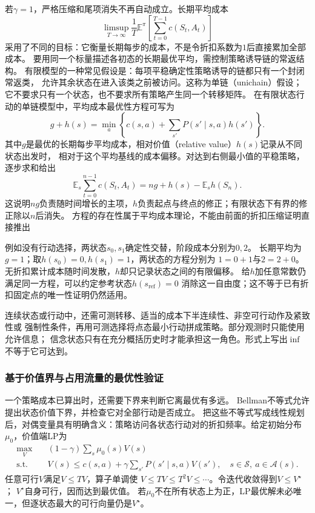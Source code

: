 若$\gamma=1$，严格压缩和尾项消失不再自动成立。长期平均成本
\[
  \limsup_{T\to\infty}\frac1T
    \mathbb E^\pi\left[\sum_{t=0}^{T-1}c(S_t,A_t)\right]
\]
采用了不同的目标：它衡量长期每步的成本，不是令折扣系数为$1$后直接累加全部成本。
要用同一个标量描述各初态的长期最优平均，需控制策略诱导链的常返结构。
有限模型的一种常见假设是：每项平稳确定性策略诱导的链都只有一个封闭常返类，
允许其余状态在进入该类之前被访问。这称为单链（unichain）假设；
它不要求只有一个状态，也不要求所有策略产生同一个转移矩阵。
在有限状态行动的单链模型中，平均成本最优性方程可写为
\[
  g+h(s)=\min_a\left\{c(s,a)+\sum_{s'}P(s'\mid s,a)h(s')\right\}.
\]
其中$g$是最优的长期每步平均成本，相对价值（relative value）$h(s)$记录从不同状态出发时，
相对于这个平均基线的成本偏移。对达到右侧最小值的平稳策略，逐步求和给出
\[
 \mathbb E_s\sum_{t=0}^{n-1}c(S_t,A_t)
 =ng+h(s)-\mathbb E_s h(S_n).
\]
这说明$ng$负责随时间增长的主项，$h$负责起点与终点的修正；有限状态下有界的修正除以$n$后消失。
方程的存在性属于平均成本理论，不能由前面的折扣压缩证明直接推出

例如没有行动选择，两状态$s_0,s_1$确定性交替，阶段成本分别为$0,2$。
长期平均为$g=1$；取$h(s_0)=0,h(s_1)=1$，两状态的方程分别为
$1=0+1$与$2=2+0$。无折扣累计成本随时间发散，$h$却只记录状态之间的有限偏移。
给$h$加任意常数仍满足同一方程，可以约定参考状态$h(s_{\mathrm{ref}})=0$
消除这一自由度；这不等于已有折扣固定点的唯一性证明仍然适用。

连续状态或行动中，还需可测转移、适当的成本下半连续性、非空可行动作及紧致性或
强制性条件，再用可测选择将点态最小行动拼成策略。部分观测时只能使用允许信息；
信念状态只有在充分概括历史时才能承担这一角色。形式上写出$\inf$不等于它可达到。

\subsubsection{基于价值界与占用流量的最优性验证}

一个策略成本已算出时，还需要下界来判断它离最优有多远。
Bellman不等式允许提出状态价值下界，并检查它对全部行动是否成立。
把这些不等式写成线性规划后，对偶变量具有明确含义：策略访问各状态行动对的折扣频率。给定初始分布$\mu_0$，价值端LP为
\begin{equation}
  \begin{aligned}
    \max_V\quad &(1-\gamma)\sum_s\mu_0(s)V(s)\\
    \text{s.t.}\quad&
      V(s)\leq c(s,a)+\gamma\sum_{s'}P(s'\mid s,a)V(s'),
      \quad s\in\mathcal S,\ a\in\mathcal A(s).
  \end{aligned}
  \label{eq:decision-value-lp}
\end{equation}
任意可行$V$满足$V\leq TV$，算子单调使
$V\leq TV\leq T^2V\leq\cdots$。令迭代收敛得到$V\leq V^\star$；
$V^\star$自身可行，因而达到最优值。
若$\mu_0$不在所有状态上为正，LP最优解未必唯一，但逐状态最大的可行向量仍是$V^\star$。

